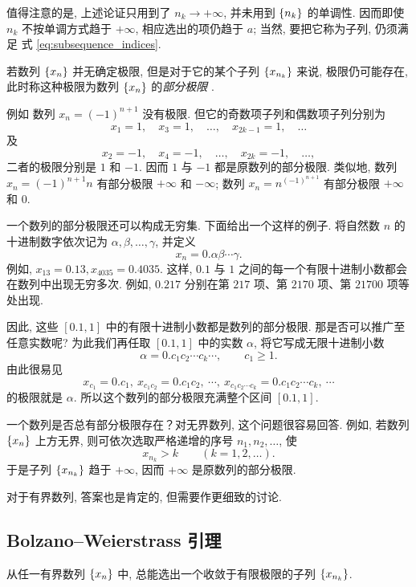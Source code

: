 值得注意的是, 上述论证只用到了 $n_k\to+\infty$, 并未用到
$\seqset[k]{n}$ 的单调性. 因而即使 $n_k$ 不按单调方式趋于 $+\infty$,
相应选出的项仍趋于 $a$; 当然, 要把它称为子列, 仍须满足
式 \eqref{eq:subsequence_indices}.

若数列 $\seqset{x}$ 并无确定极限, 但是对于它的某个子列 $\bbbrac{x_{n_k}}$ 来说,
极限仍可能存在,
此时称这种极限为数列 $\seqset{x}$ 的\emph{部分极限}
.

例如
数列
$
x_n=(-1)^{n+1}
$
没有极限.
但它的奇数项子列和偶数项子列分别为
$$
x_1=1,\quad x_3=1,\quad\ldots,\quad x_{2k-1}=1,\quad\ldots
$$
及
$$
x_2=-1,\quad x_4=-1,\quad\ldots,\quad x_{2k}=-1,\quad\ldots,
$$
二者的极限分别是 $1$ 和 $-1$. 因而 $1$ 与 $-1$ 都是原数列的部分极限.
类似地, 数列 $x_n=(-1)^{n+1}n$ 有部分极限 $+\infty$ 和 $-\infty$;
数列 $x_n=n^{(-1)^{n+1}}$ 有部分极限 $+\infty$ 和 $0$.

一个数列的部分极限还可以构成无穷集. 下面给出一个这样的例子.
将自然数 $n$ 的十进制数字依次记为 $\alpha,\beta,\ldots,\gamma$,
并定义
$$
x_n=0{.}\alpha\beta\cdots\gamma.
$$
例如,
$
x_{13}=0.13, x_{4035}=0.4035
$.
这样, $0.1$ 与 $1$ 之间的每一个有限十进制小数都会在数列中出现无穷多次.
例如, $0.217$ 分别在第 $217$ 项、第 $2170$ 项、第 $21700$ 项等处出现.

因此, 这些 $[0.1,1]$ 中的有限十进制小数都是数列的部分极限.
那是否可以推广至任意实数呢?
为此我们再任取 $[0.1,1]$ 中的实数 $\alpha$, 将它写成无限十进制小数
$$
\alpha=0{.}c_1c_2\cdots c_k\cdots,\qquad c_1\geqslant1.
$$
由此很易见
$$
x_{c_1} = 0.c_1,\ x_{c_1c_2} = 0.c_1c_2,\ \cdots, \ x_{c_1c_2\cdots c_k} = 0.c_1c_2\cdots c_k,\ \cdots
$$
的极限就是 $\alpha$.
所以这个数列的部分极限充满整个区间 $[0.1,1]$.

一个数列是否总有部分极限存在？对无界数列, 这个问题很容易回答.
例如, 若数列 $\seqset{x}$ 上方无界, 则可依次选取严格递增的序号
$n_1,n_2,\ldots$, 使
\begin{equation}\label{eq:unbounded_sequence_positive_subsequence}
x_{n_k}>k\qquad(k=1,2,\ldots).
\end{equation}
于是子列 $\bbbrac{x_{n_k}}$ 趋于 $+\infty$, 因而 $+\infty$ 是原数列的部分极限.

对于有界数列, 答案也是肯定的, 但需要作更细致的讨论.

\subsection{Bolzano--Weierstrass 引理}\label{subsec:41}
{\kaishu 从任一有界数列 $\seqset{x}$ 中, 总能选出一个收敛于有限极限的子列
$\bbbrac{x_{n_k}}$.}

